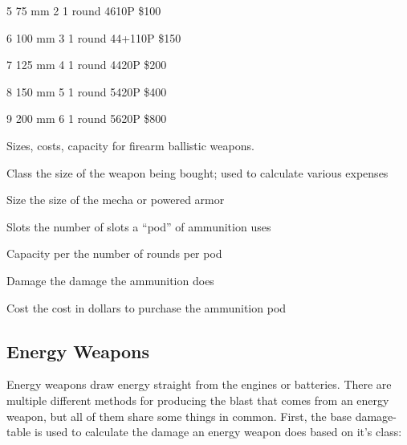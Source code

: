\documentclass[twoside]{book}
\begin{document}
                  
                   5   
                   75 mm   
                   2   
                   1 round   
                   4610P   
                   \$100   
                  
                  
                   6   
                   100 mm   
                   3   
                   1 round   
                   44+110P   
                   \$150   
                  
                  
                   7   
                   125 mm   
                   4   
                   1 round   
                   4420P   
                   \$200   
                  
                  
                   8   
                   150 mm   
                   5   
                   1 round   
                   5420P   
                   \$400   
                  
                  
                   9   
                   200 mm   
                   6   
                   1 round   
                   5620P   
                   \$800   
                  
                
                Sizes, costs, capacity for firearm ballistic
                 weapons.
              
              
                 Class 
                  the size of the weapon being bought; used to
                 calculate various expenses 
                
              
                 Size 
                  the size of the mecha or powered armor 
                
              
                 Slots 
                  the number of slots a “pod” of
                 ammunition uses 
                
              
                 Capacity per 
                  the number of rounds per pod 
                
              
                 Damage 
                  the damage the ammunition does 
                
              
                 Cost 
                  the cost in dollars to purchase the ammunition
                 pod 
                
            
\subsection{Energy Weapons}
      Energy weapons draw energy straight from the
               engines or batteries. There are multiple different methods
               for producing the blast that comes from an energy weapon,
               but all of them share some things in common. First, the
               base damage-table is used to calculate the damage an
               energy weapon does based on it’s class:   
                
\end{document}
